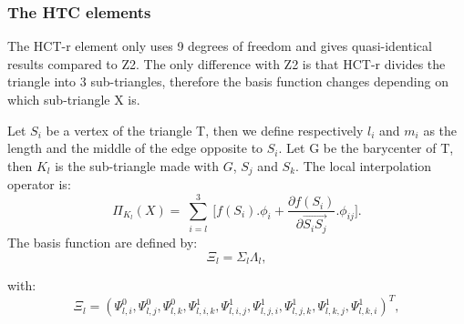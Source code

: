 \documentclass[proc]{edpsmath}
\begin{document}
\subsubsection{The HTC elements}
The HCT-r element only uses 9 degrees of freedom and gives quasi-identical results compared to Z2. The only difference with Z2 is that HCT-r divides the triangle into 3 sub-triangles, therefore the basis function changes depending on which sub-triangle X is.

Let $S_i$ be a vertex of the triangle T, then we define respectively $l_i$ and $m_i$ as the length and the middle of the edge opposite to $S_i$. Let G be the barycenter of T, then $K_l$ is the sub-triangle made with $G$, $S_j$ and $S_k$. The local interpolation operator is:
\begin{equation*}
\Pi_{K_l} (X) = \sum \limits_{\substack{i=l }}^{3}{ [f(S_i).\phi_i +  \frac{\partial f(S_i)}{\partial  \overrightarrow{ S_i S_j } }.\phi_{ij} } ].
\end{equation*} 
The basis function are defined by:
\begin{equation*}
\Xi_l =  \Sigma_l \Lambda_l,
\end{equation*} 

 \noindent with:
\begin{equation*}
  \Xi_l=(\Psi_{l,i}^0, \Psi_{l,j}^0, \Psi_{l,k}^0, \Psi_{l,i,k}^1,\Psi_{l,i,j}^1,\Psi_{l,j,i}^1,\Psi_{l,j,k}^1 ,\Psi_{l,k,j}^1,\Psi_{l,k,i}^1)^T,
\end{equation*} 
\end{document}
